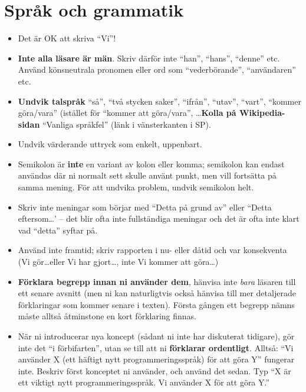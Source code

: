 \documentclass[a4paper,12pt]{article}
\begin{document}
\section{Språk och grammatik}
\label{sec:sprak-och-grammatik}

\begin{itemize}
\item    Det är OK att skriva ``Vi''!

\item    \textbf{Inte alla läsare är män}.  Skriv därför inte ``han'', ``hans'', ``denne'' etc.  Använd könsneutrala pronomen eller ord som ``vederbörande'', ``användaren'' etc.

\item    \textbf{Undvik talspråk} ``så'', ``två stycken saker'', ``ifrån'', ``utav'', ``vart'', ``kommer göra/vara'' (istället för ``kommer att göra/vara'', \ldots \textbf{Kolla på Wikipedia-sidan} ``Vanliga språkfel'' (länk i vänsterkanten i SP).

\item    Undvik värderande uttryck som enkelt, uppenbart.

\item    Semikolon är \textbf{inte} en variant av kolon eller komma; semikolon kan endast användas där ni normalt sett skulle använt punkt, men vill fortsätta på samma mening. För att undvika problem, undvik semikolon helt.

\item    Skriv inte meningar som börjar med ``Detta på grund av'' eller ``Detta eftersom\ldots' -- det blir ofta inte fullständiga meningar och det är ofta inte klart vad ``detta'' syftar på.

\item    Använd inte framtid; skriv rapporten i nu- eller dåtid och var konsekventa (Vi gör\ldots eller Vi har gjort\ldots, inte Vi kommer att göra\ldots)

\item    \textbf{Förklara begrepp innan ni använder dem}, hänvisa inte \emph{bara} läsaren till ett senare avsnitt (men ni kan naturligtvis också hänvisa till mer detaljerade förklaringar som kommer senare i texten).  Första gången ett begrepp nämns måste alltså åtminstone en kort förklaring finnas.

\item    När ni introducerar nya koncept (sådant ni inte har diskuterat tidigare), gör inte det ``i förbifarten'', utan se till att ni \textbf{förklarar ordentligt}.  Alltså: ``Vi använder X (ett häftigt nytt programmeringsspråk) för att göra Y'' fungerar inte.  Beskriv först konceptet ni använder, och använd det sedan.  Typ ``X är ett viktigt nytt programmeringsspråk.  Vi använder X för att göra Y.''


\end{itemize}
\end{document}
